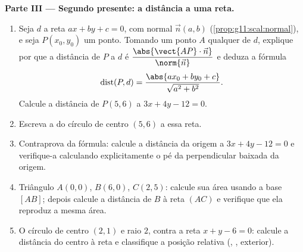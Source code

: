 \begin{problem}
\medskip
\noindent\textbf{Parte III --- Segundo presente: a distância a
uma reta.}
\begin{enumerate}[resume]
  \item Seja $d$ a reta $ax + by + c = 0$, com  normal
        $\vec n(a, b)$ (\cref{prop:g11:scal:normal}), e seja
        $P(x_0, y_0)$ um ponto. Tomando um ponto $A$ qualquer de
        $d$, explique por que a distância de $P$ a $d$ é
        $\dfrac{\abs{\vect{AP} \cdot \vec n}}{\norm{\vec n}}$ e
        deduza a fórmula
        \[
        \operatorname{dist}(P, d)
        = \frac{\abs{a x_0 + b y_0 + c}}{\sqrt{a^2 + b^2}} .
        \]
        Calcule a distância de $P(5, 6)$ a $3x + 4y - 12 = 0$.
  \item Escreva a  do círculo de centro $(5, 6)$ 
        a essa reta.
  \item Contraprova da fórmula: calcule a distância da origem a
        $3x + 4y - 12 = 0$ e verifique-a calculando
        explicitamente o pé da perpendicular baixada da origem.
  \item Triângulo $A(0,0)$, $B(6,0)$, $C(2,5)$: calcule sua área
        usando a base $[AB]$; depois calcule a distância de $B$ à
        reta $(AC)$ e verifique que ela reproduz a mesma área.
  \item O círculo de centro $(2, 1)$ e raio $2$, contra a reta
        $x + y - 6 = 0$: calcule a distância do centro à reta e
        classifique a posição relativa (, ,
        exterior).
\end{enumerate}


\end{problem}
